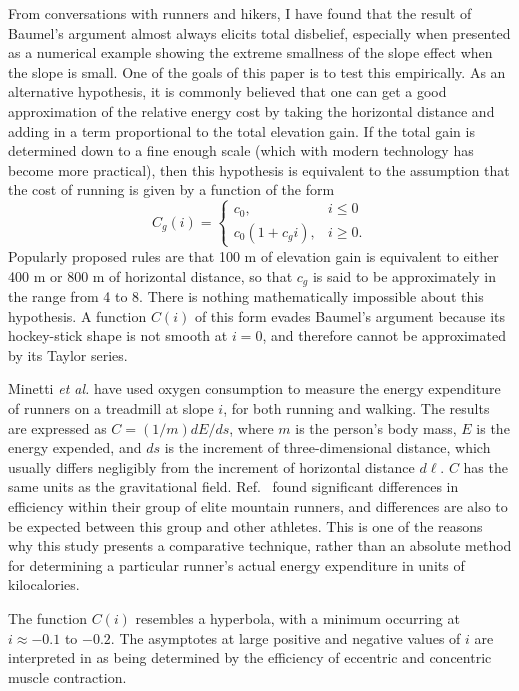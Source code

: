 \documentclass[10pt,letterpaper]{article}
\begin{document}
From conversations with runners and hikers, I have found that the result of Baumel's argument almost
always elicits total disbelief, especially when presented as a numerical example showing the extreme smallness
of the slope effect when the slope is small. One of the goals of this paper is to test this empirically.
As an alternative hypothesis, it is commonly believed that one can get a good approximation
of the relative energy cost by taking the horizontal distance and adding in a term proportional to the total elevation gain.
If the total gain is determined down to a fine enough scale (which with modern technology has become
more practical), then this hypothesis is equivalent to the assumption that the cost of running is
given by a function of the form
\begin{equation}\label{eq:gain-only}
   C_g(i) = 
  \begin{cases}
     c_0, & i\le0 \\
     c_0(1+c_g i), & i\ge 0.
  \end{cases}
\end{equation}
Popularly proposed rules are that 100 m of elevation gain is equivalent to either 400 m or 800 m of horizontal distance,
so that $c_g$ is said to be approximately in the range from 4 to 8. There is nothing mathematically impossible
about this hypothesis. A function $C(i)$ of this form evades Baumel's argument because its hockey-stick shape
is not smooth at $i=0$, and therefore cannot be approximated by its Taylor series.

Minetti \emph{et al.}\cite{minetti} have used oxygen
consumption to measure the energy expenditure of runners on a treadmill at slope $i$, for both
running and walking.
The results are expressed as $C=(1/m)d E/d s$, where $m$ is the person's body mass,
$E$ is the energy expended, and $d s$ is the increment of three-dimensional distance, which
usually differs negligibly from the increment of horizontal distance $d \ell$.
$C$ has the same units as the gravitational field.
Ref.~\cite{minetti} found significant differences in efficiency within their group of elite mountain
runners, and differences are also to be expected between this group and other athletes. This is one
of the reasons why this study presents a comparative technique, rather than an absolute method for
determining a particular runner's actual energy expenditure in units of kilocalories.

The function $C(i)$ resembles a hyperbola, with a
minimum occurring at $i\approx -0.1$ to $-0.2$. 
The asymptotes
at large positive and negative values of $i$ are interpreted in \cite{minetti} as being determined by the
efficiency of eccentric and concentric muscle contraction. 
\end{document}
